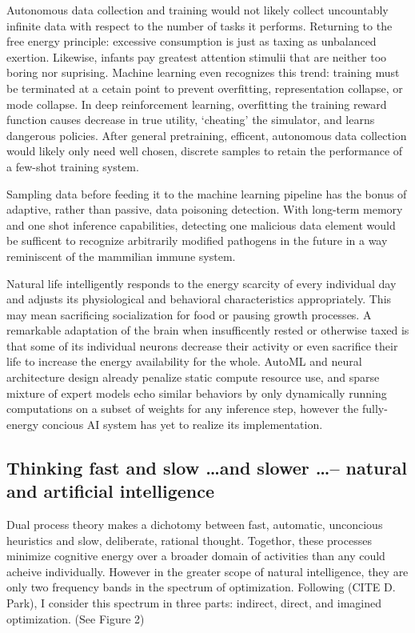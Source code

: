 Autonomous data collection and training would not likely collect uncountably infinite data with respect to the number of tasks it performs. Returning to the free energy principle: excessive consumption is just as taxing as unbalanced exertion. Likewise, infants pay greatest attention stimulii that are neither too boring nor suprising. Machine learning even recognizes this trend: training must be terminated at a cetain point to prevent overfitting, representation collapse, or mode collapse. In deep reinforcement learning, overfitting the training reward function causes decrease in true utility, `cheating' the simulator, and learns dangerous policies. After general pretraining, efficent, autonomous data collection would likely only need well chosen, discrete samples to retain the performance of a few-shot training system. 

Sampling data before feeding it to the machine learning pipeline has the bonus of adaptive, rather than passive, data poisoning detection. With long-term memory and one shot inference capabilities, detecting one malicious data element would be sufficent to recognize arbitrarily modified pathogens in the future in a way reminiscent of the mammilian immune system.

Natural life intelligently responds to the energy scarcity of every individual day and adjusts its physiological and behavioral characteristics appropriately. This may mean sacrificing socialization for food or pausing growth processes. A remarkable adaptation of the brain when insufficently rested or otherwise taxed is that some of its individual neurons decrease their activity or even sacrifice their life to increase the energy availability for the whole. AutoML and neural architecture design already penalize static compute resource use, and sparse mixture of expert models echo similar behaviors by only dynamically running computations on a subset of weights for any inference step, however the fully-energy concious AI system has yet to realize its implementation.
    
\subsection{Thinking fast and slow \dots and slower \dots -- natural and artificial intelligence}

Dual process theory makes a dichotomy between fast, automatic, unconcious heuristics and slow, deliberate, rational thought. Togethor, these processes minimize cognitive energy over a broader domain of activities than any could acheive individually. However in the greater scope of natural intelligence, they are only two frequency bands in the spectrum of optimization. Following (CITE D. Park), I consider this spectrum in three parts: indirect, direct, and imagined optimization. (See Figure 2)

